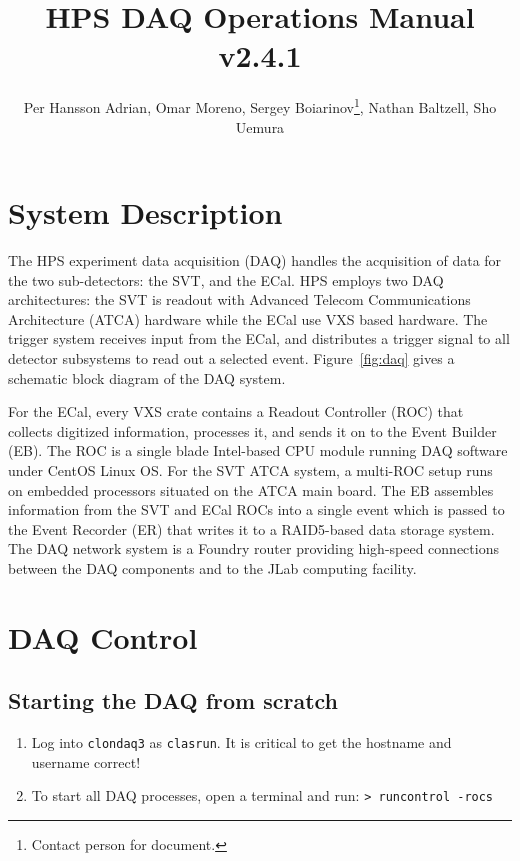 \documentclass[12pt]{article}
\title{HPS DAQ Operations Manual v2.4.1}
\author{Per Hansson Adrian, Omar Moreno, Sergey Boiarinov\thanks{Contact person for document.}, Nathan Baltzell, Sho Uemura }
\begin{document}
\maketitle

\tableofcontents

\section{System Description}
The HPS experiment data acquisition (DAQ) handles the acquisition of data for the two sub-detectors: the SVT,  and the ECal. HPS employs two DAQ architectures: the SVT is readout with Advanced Telecom Communications Architecture (ATCA) hardware while the ECal use VXS based hardware. The trigger system receives input from the ECal, and distributes a trigger signal to all detector subsystems to read out a selected event. Figure~\ref{fig:daq} gives a schematic block diagram of the DAQ system.

For the ECal, every VXS crate contains a Readout Controller (ROC) that collects digitized information, processes it, and sends it on to the Event Builder (EB). The ROC is a single blade Intel-based CPU module running DAQ software under CentOS Linux OS. For the SVT ATCA system, a multi-ROC setup runs on embedded processors situated on the ATCA main board. The EB assembles information from the SVT and ECal ROCs into a single event which is passed to the Event Recorder (ER) that writes it to a RAID5-based data storage system. The DAQ network system is a Foundry router providing high-speed connections between the DAQ components and to the JLab computing facility. 

\newpage
\section{DAQ Control}
\label{sec:daq_control}

\subsection{Starting the DAQ from scratch}\label{sec:daqstart}

\begin{enumerate}
\item 
    Log into \texttt{clondaq3} as \texttt{clasrun}.
    \subitem It is critical to get the hostname and username correct!
\item 
To start all DAQ processes, open a terminal and run:\newline
\texttt{> runcontrol -rocs}\newline
\end{enumerate}
\end{document}

